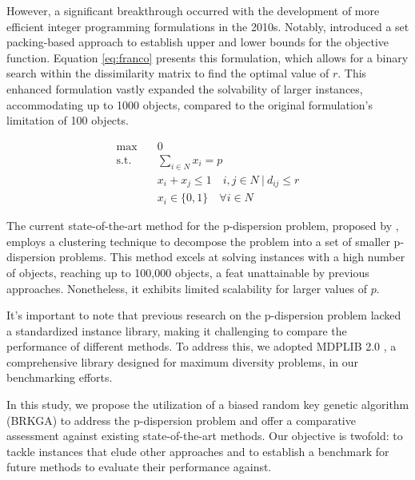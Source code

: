 \documentclass[preprint,12pt]{elsarticle}
\begin{document}
However, a significant breakthrough occurred with the development of more efficient integer programming formulations in the 2010s. Notably,\citet{franco2015solving} introduced a set packing-based approach to establish upper and lower bounds for the objective function. Equation \ref{eq:franco} presents this formulation, which allows for a binary search within the dissimilarity matrix to find the optimal value of $r$. This enhanced formulation vastly expanded the solvability of larger instances, accommodating up to 1000 objects, compared to the original formulation's limitation of 100 objects.

\begin{equation}
    \label{eq:franco}
    \begin{aligned}
        \max \quad & 0 \\
        \text{s.t.} \quad & \sum_{i \in N} x_i = p \\
        & x_i + x_j \leq 1 \quad i,j \in N \ |\  d_{ij} \leq r \\
        & x_i \in \{0,1\} \quad \forall i \in N
    \end{aligned}
\end{equation}

The current state-of-the-art method for the p-dispersion problem, proposed by \citet{Contardo2020-vn}, employs a clustering technique to decompose the problem into a set of smaller p-dispersion problems. This method excels at solving instances with a high number of objects, reaching up to 100,000 objects, a feat unattainable by previous approaches. Nonetheless, it exhibits limited scalability for larger values of $p$.

It's important to note that previous research on the p-dispersion problem lacked a standardized instance library, making it challenging to compare the performance of different methods. To address this, we adopted MDPLIB 2.0 \citep{marti2021mdplib}, a comprehensive library designed for maximum diversity problems, in our benchmarking efforts.

In this study, we propose the utilization of a biased random key genetic algorithm (BRKGA) \citep{Goncalves2011-kp} to address the p-dispersion problem and offer a comparative assessment against existing state-of-the-art methods. Our objective is twofold: to tackle instances that elude other approaches and to establish a benchmark for future methods to evaluate their performance against.
\end{document}
